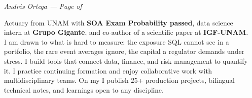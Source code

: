\documentclass[10pt, letterpaper]{awesome-cv}
\renewcommand{\acvSectionContentTopSkip}{0.3mm}
\renewenvironment{cvparagraph}{%
  \vspace{\acvSectionContentTopSkip}%
  \vspace{-3mm}%
  \paragraphstyle%
}{%
  \par%
  \vspace{0.3mm}%
}
\renewcommand*{\paragraphstyle}{\fontsize{8.5pt}{1.15em}\bodyfontlight\upshape\color{text}}
\begin{document}
\makecvheader[C]


\makecvfooter
  {}
  {\color{lightgray}\textit{\small Andrés Ortega — Page \thepage{} of \pageref*{LastPage}}}
  {}


\begin{cvparagraph}
Actuary from UNAM with \textbf{SOA Exam Probability passed}, data science intern at \textbf{Grupo Gigante}, and co-author of a scientific paper at \textbf{IGF-UNAM}. I am drawn to what is hard to measure: the exposure SQL cannot see in a portfolio, the rare event averages ignore, the capital a regulator demands under stress. I build tools that connect data, finance, and risk management to quantify it. I practice continuing formation and enjoy collaborative work with multidisciplinary teams. On my  I publish 25+ production projects, bilingual technical notes, and learnings open to any discipline.
\end{cvparagraph}

\end{document}
